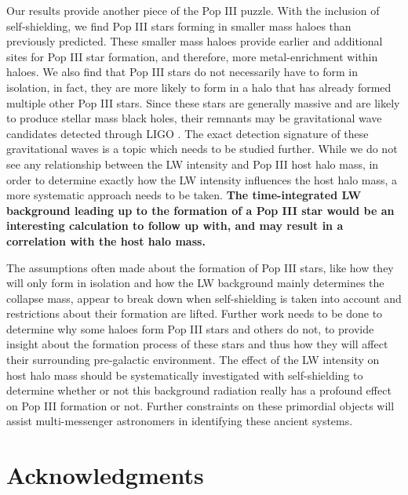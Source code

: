 \documentclass[fleqn,usenatbib]{mnras}
\begin{document}
Our results provide another piece of the Pop III puzzle. With the inclusion of \hh{} self-shielding, we find Pop III stars forming in smaller mass haloes than previously predicted. These smaller mass haloes provide earlier and additional sites for Pop III star formation, and therefore, more metal-enrichment within haloes. We also find that Pop III stars do not necessarily have to form in isolation, in fact, they are more likely to form in a halo that has already formed multiple other Pop III stars. Since these stars are generally massive and are likely to produce stellar mass black holes, their remnants may be gravitational wave candidates detected through LIGO \citep{Hartwig16}. The exact detection signature of these gravitational waves is a topic which needs to be studied further. While we do not see any relationship between the LW intensity and Pop III host halo mass,  in order to determine exactly how the LW intensity influences the host halo mass, a more systematic approach needs to be taken. \textbf{The time-integrated LW background leading up to the formation of a Pop III star would be an interesting calculation to follow up with, and may result in a correlation with the host halo mass.} 

The assumptions often made about the formation of Pop III stars, like how they will only form in isolation and how the LW background mainly determines the collapse mass, appear to break down when self-shielding is taken into account and restrictions about their formation are lifted. Further work needs to be done to determine why some haloes form Pop III stars and others do not, to provide insight about the formation process of these stars and thus how they will affect their surrounding pre-galactic environment. The effect of the LW intensity on host halo mass should be systematically investigated with \hh{} self-shielding to determine whether or not this background radiation really has a profound effect on Pop III formation or not. Further constraints on these primordial objects will assist multi-messenger astronomers in identifying these ancient systems.

\section*{Acknowledgments}
\end{document}
